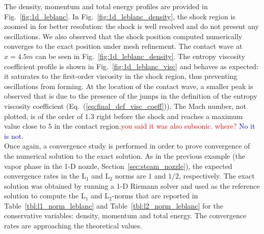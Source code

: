 \documentclass[preprint,10pt]{elsarticle}
\newcommand{\eqt}[1]{Eq.~(\ref{#1})}                     %
\newcommand{\fig}[1]{Fig.~\ref{#1}}                      %
\newcommand{\tbl}[1]{Table~\ref{#1}}                     %
\newcommand{\sct}[1]{Section~\ref{#1}}                   %
\newcommand{\tcr}[1]{\textcolor{red}{#1}}
\newcommand{\tcb}[1]{\textcolor{blue}{#1}}
\begin{document}
%
The density, momentum and total energy profiles are provided in \fig{fig:1d_leblanc}. In \fig{fig:1d_leblanc_density}, the shock region is zoomed in for better resolution: the shock is well resolved and do not present any oscillations. We also observed that the shock position computed numerically converges to the exact position under mesh refinement. The contact wave at $x=4.5m$ can be seen in \fig{fig:1d_leblanc_density}. The entropy viscosity coefficient profile is shown in \fig{fig:1d_leblanc_visc} and behaves as expected: it saturates to the first-order viscosity in the shock region, thus preventing oscillations from forming. At the location of the contact wave, a smaller peak is observed that is due to the presence of the jumps in the definition of the entropy viscosity coefficient (\eqt{eq:final_def_visc_coeff}).  The Mach number, not plotted, is of the order of $1.3$ right before the shock and reaches a maximum value close to $5$ in the contact region.\tcr{you said it was also subsonic. where?} \tcb{No it is not.}\\
Once again, a convergence study is performed in order to prove convergence of the numerical solution to the exact solution. As in the previous example (the vapor phase in the 1-D nozzle, \sct{sec:steam_nozzle}), the expected convergence rates in the L$_1$ and L$_2$ norms are $1$ and $1/2$, respectively. The exact solution was obtained by running a 1-D Riemann solver and used as the reference solution to compute the L$_1$ and L$_2$-norms that are reported in \tbl{tbl:l1_norm_leblanc} and \tbl{tbl:l2_norm_leblanc} for the conservative variables: density, momentum and total energy. The convergence rates are approaching the theoretical values.
\end{document}

